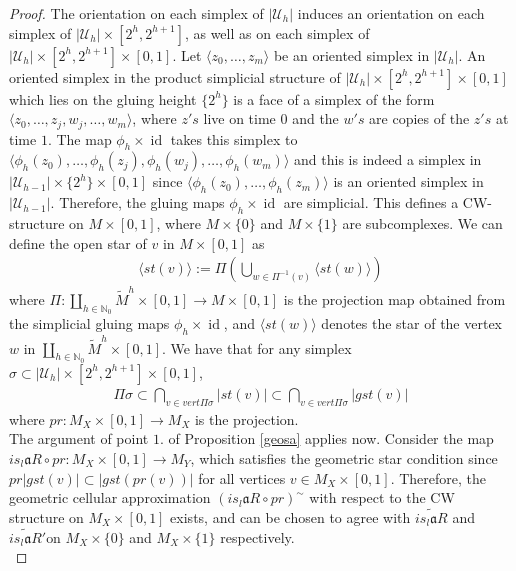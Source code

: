\documentclass[a4paper,11pt]{article}
\theoremstyle{definition}
\theoremstyle{plain}
\theoremstyle{remark}
\DeclareMathOperator{\id}{id}
\begin{document}
{\begin{proof}
The orientation on each simplex of $|\mathcal{U}_{h}|$ induces an orientation on each simplex of $|\mathcal{U}_{h}| \times [2^h,2^{h+1}]$, as well as on each simplex of $|\mathcal{U}_{h}| \times [2^h,2^{h+1}] \times [0,1]$. Let $\langle z_0,\dots, z_{m} \rangle$ be an oriented simplex in $|\mathcal{U}_{h}|$.  An oriented simplex in the product simplicial structure of $|\mathcal{U}_{h}| \times [2^h,2^{h+1}] \times [0,1]$ which lies on the gluing height $\{2^h\}$ is a face of a simplex of the form $\langle z_{0},\dots,z_{j}, w_{j}, \dots, w_{m} \rangle$, where $z's$ live on time $0$ and the $w's$ are copies of the $z's$ at time $1$. The map $\phi_{h} \times \id$ takes this simplex to $\langle  \phi_{h}(z_{0}),\dots, \phi_{h}(z_{j}), \phi_{h}(w_{j}), \dots, \phi_{h}(w_{m})\rangle $ and this is indeed a simplex in $|\mathcal{U}_{h-1}| \times \{2^h\} \times [0,1]$ since $\langle \phi_{h}(z_0), \dots, \phi_{h}(z_{m})\rangle$ is an oriented simplex in $|\mathcal{U}_{h-1}|$. Therefore, the gluing maps $\phi_{h}\times \id$ are simplicial. This defines a CW-structure on $M \times [0,1]$, where $M \times \{0\}$ and $M\times \{1\}$ are subcomplexes. We can define the open star of $v$ in $M \times [0,1]$ as 
\begin{align*}
\langle st(v)\rangle:= \Pi (\bigcup_{w \in \Pi^{-1}(v)} \langle st(w) \rangle)
\end{align*}
where $\Pi: \coprod_{h\in \mathbb{N}_{0}} \tilde{M}^h \times [0,1] \rightarrow M \times [0,1]$ is the projection map obtained from the simplicial gluing maps $\phi_{h}\times \id$, and $\langle st(w)\rangle$ denotes the star of the vertex $w$ in $\coprod_{h\in \mathbb{N}_{0}} \tilde{M}^h \times [0,1]$. We have that for any simplex $\sigma\subset |\mathcal{U}_{h}| \times [2^h,2^{h+1}] \times [0,1]$, 
\begin{align*}
\Pi \sigma \subset \bigcap_{v \in vert \Pi \sigma}|st(v)| \subset \bigcap_{v \in vert \Pi \sigma}|gst(v)|
\end{align*}
where $pr: M_{X}\times [0,1]\rightarrow M_{X}$ is the projection.\\

The argument of point $1$. of Proposition \ref{geosa} applies now. Consider the map $is_{l}\mathfrak{a}R \circ pr: M_{X} \times [0,1] \rightarrow M_{Y}$, which satisfies the geometric star condition since $pr |gst(v)| \subset |gst(pr (v))|$ for all vertices $v\in  M_{X} \times [0,1]$. Therefore, the geometric cellular approximation $(is_{l}\mathfrak{a}R \circ pr)^{\sim}$ with respect to the CW structure on $M_{X}\times [0,1]$ exists, and can be chosen to agree with $\widetilde{is_{l}\mathfrak{a}R}$ and $\widetilde{is_{l}\mathfrak{a}R}'$on $M_{X} \times \{0\}$ and $M_{X} \times \{1\}$ respectively.\\



\end{proof}}
\end{document}
